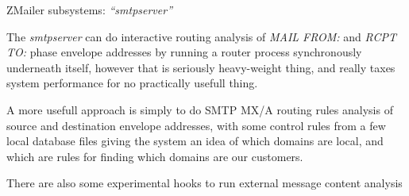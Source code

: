 \documentclass[a4paper,landscape]{slides}
\newcommand{\ZM}{ZMailer}
\begin{document}
\begin{slide}

\centerline{\large \ZM{} subsystems: {\it ``smtpserver''}}

The {\it smtpserver} can do interactive routing analysis of
{\it MAIL FROM:} and {\it RCPT TO:} phase envelope addresses
by running a router process synchronously underneath itself,
however that is seriously heavy-weight thing, and really taxes
system performance for no practically usefull thing.

A more usefull approach is simply to do SMTP MX/A routing rules
analysis of source and destination envelope addresses, with
some control rules from a few local database files giving the
system an idea of which domains are local, and which are rules
for finding which domains are our customers.

There are also some experimental hooks to run external message
content analysis 

\vfill

\end{slide}

\end{document}
